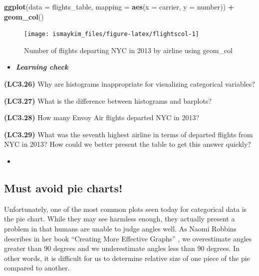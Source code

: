 \documentclass[12pt,]{krantz}
\makeatletter
\newenvironment{Shaded}{\begin{snugshade}}{\end{snugshade}}
\newcommand{\KeywordTok}[1]{\textcolor[rgb]{0.27,0.27,0.27}{\textbf{#1}}}
\newcommand{\DataTypeTok}[1]{\textcolor[rgb]{0.27,0.27,0.27}{#1}}
\newcommand{\StringTok}[1]{\textcolor[rgb]{0.5,0.5,0.5}{#1}}
\newcommand{\OperatorTok}[1]{\textcolor[rgb]{0.43,0.43,0.43}{\textbf{#1}}}
\newcommand{\NormalTok}[1]{#1}
\newenvironment{kframe}{%
\medskip{}
\setlength{\fboxsep}{.8em}
 \def\at@end@of@kframe{}%
 \ifinner\ifhmode%
  \def\at@end@of@kframe{\end{minipage}}%
  \begin{minipage}{\columnwidth}%
 \fi\fi%
 \def\FrameCommand##1{\hskip\@totalleftmargin \hskip-\fboxsep
 \colorbox{shadecolor}{##1}\hskip-\fboxsep
     \hskip-\linewidth \hskip-\@totalleftmargin \hskip\columnwidth}%
 \MakeFramed {\advance\hsize-\width
   \@totalleftmargin\z@ \linewidth\hsize
   \@setminipage}}%
 {\par\unskip\endMakeFramed%
 \at@end@of@kframe}
\renewenvironment{Shaded}{\begin{kframe}}{\end{kframe}}
\newenvironment{rmdblock}[1]
  {\begin{shaded*}
  \begin{itemize}
  \renewcommand{\labelitemi}{
    \raisebox{-.7\height}[0pt][0pt]{
    }
  }
  \item
  }
  {
  \end{itemize}
  \end{shaded*}
  }
\newenvironment{learncheck}
  {\begin{rmdblock}{warning}}
  {\end{rmdblock}}
\theoremstyle{definition}
\theoremstyle{definition}
\theoremstyle{definition}
\theoremstyle{remark}
\makeatother
\begin{document}
\begin{Shaded}
\begin{Highlighting}[]
\KeywordTok{ggplot}\NormalTok{(}\DataTypeTok{data =}\NormalTok{ flights_table, }\DataTypeTok{mapping =} \KeywordTok{aes}\NormalTok{(}\DataTypeTok{x =}\NormalTok{ carrier, }\DataTypeTok{y =}\NormalTok{ number)) }\OperatorTok{+}
\StringTok{  }\KeywordTok{geom_col}\NormalTok{()}
\end{Highlighting}
\end{Shaded}

\begin{figure}

{\centering \texttt{[image: ismaykim\_files/figure-latex/flightscol-1]} 

}

\caption{Number of flights departing NYC in 2013 by airline using
geom\_col}\label{fig:flightscol}
\end{figure}

\begin{learncheck}
\textbf{\emph{Learning check}}
\end{learncheck}

\textbf{(LC3.26)} Why are histograms inappropriate for visualizing
categorical variables?

\textbf{(LC3.27)} What is the difference between histograms and
barplots?

\textbf{(LC3.28)} How many Envoy Air flights departed NYC in 2013?

\textbf{(LC3.29)} What was the seventh highest airline in terms of
departed flights from NYC in 2013? How could we better present the table
to get this answer quickly?

\begin{learncheck}

\end{learncheck}

\subsection{Must avoid pie charts!}\label{must-avoid-pie-charts}

Unfortunately, one of the most common plots seen today for categorical
data is the pie chart. While they may see harmless enough, they actually
present a problem in that humans are unable to judge angles well. As
Naomi Robbins describes in her book ``Creating More Effective Graphs''
\citep{robbins2013}, we overestimate angles greater than 90 degrees and
we underestimate angles less than 90 degrees. In other words, it is
difficult for us to determine relative size of one piece of the pie
compared to another.
\end{document}
